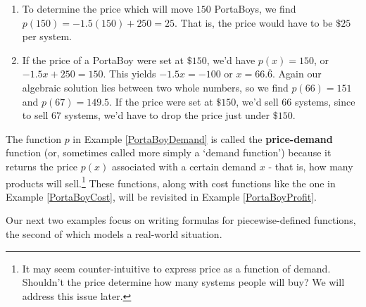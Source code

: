 \documentclass{ximera}
\begin{document}
\begin{example}
\begin{explanation}
\begin{enumerate}
\item  To determine the price which will move $150$ PortaBoys, we find $p(150) = -1.5(150) + 250 = 25$.  That is, the price would have to be $\$25$ per system.

\item  If the price of a PortaBoy were set at $\$150$, we'd have $p(x) = 150$, or $-1.5x + 250 = 150$.  This yields $-1.5x = -100$ or $x = 66.\overline{6}$. Again our algebraic solution lies between two whole numbers, so we find $p(66) = 151$ and $p(67) = 149.5$.  If the price were set at $\$ 150$, we'd sell $66$ systems, since to sell $67$ systems, we'd have to drop the price just under $\$150$.  

\end{enumerate}
\end{explanation}

\end{example}


The function $p$ in Example \ref{PortaBoyDemand} is called the \textbf{price-demand} function (or, sometimes called more simply a `demand function') because it returns the price $p(x)$ associated with a certain demand $x$ - that is, how many products will sell.\footnote{It may seem counter-intuitive to express price as a function of demand.  Shouldn't the price determine how many systems people will buy?  We will address this issue later.}  These functions, along with cost functions like the one in Example \ref{PortaBoyCost}, will be revisited in Example \ref{PortaBoyProfit}.



Our next two examples focus on writing formulas for piecewise-defined functions, the second of which models a real-world situation.
\end{document}
